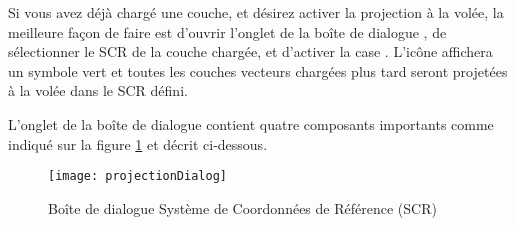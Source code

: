 Si vous avez déjà chargé une couche, et désirez activer la projection à la
volée, la meilleure façon de faire est d'ouvrir l'onglet  de la boîte de dialogue , de sélectionner le SCR de la couche chargée, et d'activer la case
. L'icône
 affichera un symbole vert et
toutes les couches vecteurs chargées plus tard seront projetées à la volée dans
le SCR défini.
 
L'onglet  de la boîte de dialogue
 contient quatre composants importants comme
indiqué sur la figure \ref{fig:projections} et décrit ci-dessous.

\begin{figure}[ht]
   \begin{center}
   \caption{Boîte de dialogue Système de Coordonnées de Référence 
(SCR)\nixcaption}\label{fig:projections}\smallskip
   \texttt{[image: projectionDialog]}
\end{center}
\end{figure}

